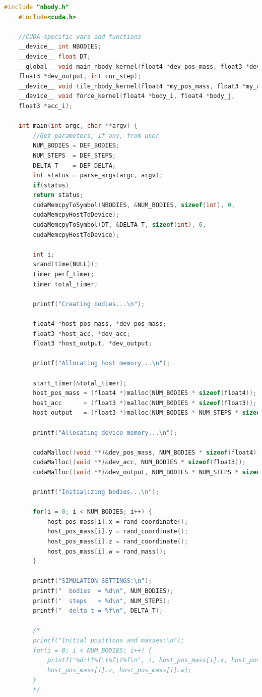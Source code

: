 \documentclass[11pt,a4paper]{article}
\begin{document}
	\begin{lstlisting}[language=c]
	#include "nbody.h"
	#include<cuda.h>
	
	//CUDA-specific vars and functions
	__device__ int NBODIES;
	__device__ float DT;
	__global__ void main_nbody_kernel(float4 *dev_pos_mass, float3 *dev_acc,
	float3 *dev_output, int cur_step);
	__device__ void tile_nbody_kernel(float4 *my_pos_mass, float3 *my_acc);
	__device__ void force_kernel(float4 *body_i, float4 *body_j,
	float3 *acc_i);
	
	int main(int argc, char **argv) {
		//Get parameters, if any, from user
		NUM_BODIES = DEF_BODIES;
		NUM_STEPS  = DEF_STEPS;
		DELTA_T    = DEF_DELTA;
		int status = parse_args(argc, argv);
		if(status)
		return status;
		cudaMemcpyToSymbol(NBODIES, &NUM_BODIES, sizeof(int), 0, 
		cudaMemcpyHostToDevice);
		cudaMemcpyToSymbol(DT, &DELTA_T, sizeof(int), 0, 
		cudaMemcpyHostToDevice);
		
		int i;
		srand(time(NULL));
		timer perf_timer;
		timer total_timer;
		
		printf("Creating bodies...\n");
		
		float4 *host_pos_mass, *dev_pos_mass;
		float3 *host_acc, *dev_acc;
		float3 *host_output, *dev_output;
		
		printf("Allocating host memory...\n");
		
		start_timer(&total_timer);
		host_pos_mass = (float4 *)malloc(NUM_BODIES * sizeof(float4));
		host_acc      = (float3 *)malloc(NUM_BODIES * sizeof(float3));
		host_output   = (float3 *)malloc(NUM_BODIES * NUM_STEPS * sizeof(float3));
		
		printf("Allocating device memory...\n");
		
		cudaMalloc((void **)&dev_pos_mass, NUM_BODIES * sizeof(float4));
		cudaMalloc((void **)&dev_acc, NUM_BODIES * sizeof(float3));
		cudaMalloc((void **)&dev_output, NUM_BODIES * NUM_STEPS * sizeof(float3));
		
		printf("Initializing bodies...\n");
		
		for(i = 0; i < NUM_BODIES; i++) {
			host_pos_mass[i].x = rand_coordinate();
			host_pos_mass[i].y = rand_coordinate();
			host_pos_mass[i].z = rand_coordinate();
			host_pos_mass[i].w = rand_mass();
		}
		
		printf("SIMULATION SETTINGS:\n");
		printf("  bodies  = %d\n", NUM_BODIES);
		printf("  steps   = %d\n", NUM_STEPS);
		printf("  delta t = %f\n", DELTA_T);
		
		/*
		printf("Initial positions and masses:\n");
		for(i = 0; i < NUM_BODIES; i++) {
			printf("%d:\t%f\t%f\t%f\n", i, host_pos_mass[i].x, host_pos_mass[i].y,
			host_pos_mass[i].z, host_pos_mass[i].w);
		}
		*/
		

\end{lstlisting}
\end{document}
